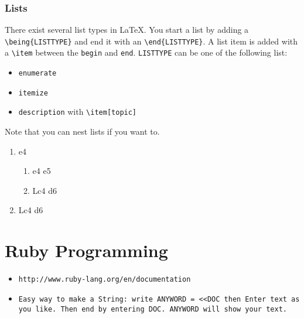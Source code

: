 \documentclass[10pt,a4paper]{scrartcl}
\begin{document}
\subsubsection{Lists}
There exist several list types in \LaTeX. You start a list by adding a 
\verb$\being{LISTTYPE}$ and end it with an \verb$\end{LISTTYPE}$. A list item
is added with a \verb$\item$ between the \texttt{begin} and \texttt{end}.
\texttt{LISTTYPE} can be one of the following list:
\begin{itemize}
	\item \texttt{enumerate}
	\item \texttt{itemize}
	\item \texttt{description} with \verb$\item[topic]$
\end{itemize}
\noindent Note that you can nest lists if you want to.
\begin{enumerate}
	\item{e4} 	
		\begin{enumerate}
			\item{e4}   e5
			\item Lc4 d6
		\end{enumerate}
	\item Lc4 d6
\end{enumerate}


\section{Ruby Programming}

\begin{itemize}

\item \texttt{http://www.ruby-lang.org/en/documentation}
\item \texttt{Easy way to make a String: write  ANYWORD = <<DOC then Enter text as you like. Then end by entering DOC. ANYWORD will show your text.} 

\end{itemize}
\end{document}
